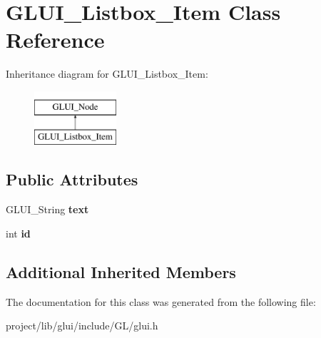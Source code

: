 \hypertarget{classGLUI__Listbox__Item}{\section{G\-L\-U\-I\-\_\-\-Listbox\-\_\-\-Item Class Reference}
\label{classGLUI__Listbox__Item}
}
Inheritance diagram for G\-L\-U\-I\-\_\-\-Listbox\-\_\-\-Item\-:\begin{figure}[H]
\begin{center}
\leavevmode
\includegraphics[height=2.000000cm]{classGLUI__Listbox__Item}
\end{center}
\end{figure}
\subsection*{Public Attributes}
\begin{DoxyCompactItemize}
\item 
\hypertarget{classGLUI__Listbox__Item_a93ab7eacdaf81a43b07b89e60bc5edbe}{G\-L\-U\-I\-\_\-\-String {\bfseries text}}\label{classGLUI__Listbox__Item_a93ab7eacdaf81a43b07b89e60bc5edbe}

\item 
\hypertarget{classGLUI__Listbox__Item_a82c3decf8704010c91232ad6e2ea95d9}{int {\bfseries id}}\label{classGLUI__Listbox__Item_a82c3decf8704010c91232ad6e2ea95d9}

\end{DoxyCompactItemize}
\subsection*{Additional Inherited Members}


The documentation for this class was generated from the following file\-:\begin{DoxyCompactItemize}
\item 
project/lib/glui/include/\-G\-L/glui.\-h\end{DoxyCompactItemize}
